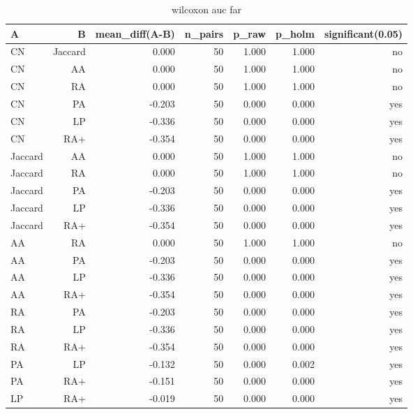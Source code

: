 \begin{table}[t]
\centering
\caption{wilcoxon auc far}
\label{tab:wilcoxon_auc_far}
\begin{tabular}{lrrrrrr}
\hline
A & B & mean\_diff(A-B) & n\_pairs & p\_raw & p\_holm & significant(0.05) \\
\hline
CN & Jaccard & 0.000 & 50 & 1.000 & 1.000 & no \\
CN & AA & 0.000 & 50 & 1.000 & 1.000 & no \\
CN & RA & 0.000 & 50 & 1.000 & 1.000 & no \\
CN & PA & -0.203 & 50 & 0.000 & 0.000 & yes \\
CN & LP & -0.336 & 50 & 0.000 & 0.000 & yes \\
CN & RA+ & -0.354 & 50 & 0.000 & 0.000 & yes \\
Jaccard & AA & 0.000 & 50 & 1.000 & 1.000 & no \\
Jaccard & RA & 0.000 & 50 & 1.000 & 1.000 & no \\
Jaccard & PA & -0.203 & 50 & 0.000 & 0.000 & yes \\
Jaccard & LP & -0.336 & 50 & 0.000 & 0.000 & yes \\
Jaccard & RA+ & -0.354 & 50 & 0.000 & 0.000 & yes \\
AA & RA & 0.000 & 50 & 1.000 & 1.000 & no \\
AA & PA & -0.203 & 50 & 0.000 & 0.000 & yes \\
AA & LP & -0.336 & 50 & 0.000 & 0.000 & yes \\
AA & RA+ & -0.354 & 50 & 0.000 & 0.000 & yes \\
RA & PA & -0.203 & 50 & 0.000 & 0.000 & yes \\
RA & LP & -0.336 & 50 & 0.000 & 0.000 & yes \\
RA & RA+ & -0.354 & 50 & 0.000 & 0.000 & yes \\
PA & LP & -0.132 & 50 & 0.000 & 0.002 & yes \\
PA & RA+ & -0.151 & 50 & 0.000 & 0.000 & yes \\
LP & RA+ & -0.019 & 50 & 0.000 & 0.000 & yes \\
\hline
\end{tabular}
\end{table}